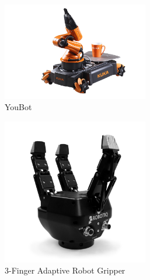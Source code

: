 \begin{figure}
    \centering
    \begin{subfigure}{.3\linewidth}
        \centering
    \includegraphics[width=0.7\textwidth]{Images/KukayouBot.png}
        \caption[youBot]{YouBot \cite{KukayouBot}}
        \label{fig:YouBot}
    \end{subfigure}
    \begin{subfigure}{.3\linewidth}
        \centering
        \includegraphics[width=0.7\textwidth]{Images/3-finger-robot-gripper-robotiq.jpg}
        \caption[3-Finger Adaptive Robot Gripper]{3-Finger Adaptive Robot Gripper \cite{RobotIQpic}}
        \label{lbel:Robotiq3Finger}
    \end{subfigure}
    \begin{subfigure}{.3\linewidth}
        \centering

\end{subfigure}
\end{figure}

